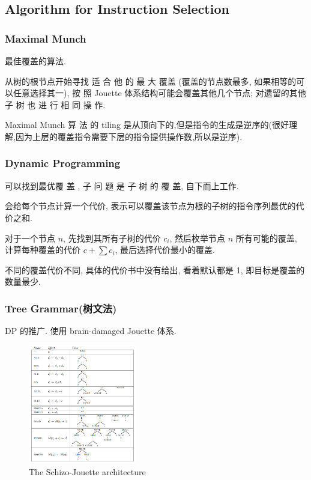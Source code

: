 \subsection{Algorithm for Instruction Selection}
\subsubsection{Maximal Munch}
最佳覆盖的算法.

从树的根节点开始寻找 适 合 他 的 最 大 覆盖 (覆盖的节点数最多, 如果相等的可以任意选择其一), 按 照 Jouette 体系结构可能会覆盖其他几个节点; 对遗留的其他 子 树 也 进 行 相 同 操 作.

Maximal Munch 算 法 的 tiling 是从顶向下的,但是指令的生成是逆序的(很好理解,因为上层的覆盖指令需要下层的指令提供操作数,所以是逆序).


\subsubsection{Dynamic Programming}
可以找到最优覆 盖 , 子 问 题 是 子 树 的 覆 盖, 自下而上工作.

会给每个节点计算一个代价, 表示可以覆盖该节点为根的子树的指令序列最优的代价之和. 

对于一个节点 $n$, 先找到其所有子树的代价 $c_i$, 然后枚举节点 $n$ 所有可能的覆盖, 计算每种覆盖的代价 $c+\sum c_i$, 最后选择代价最小的覆盖.

不同的覆盖代价不同, 具体的代价书中没有给出, 看着默认都是 1, 即目标是覆盖的数量最少.


\subsubsection{Tree Grammar(树文法)}
DP 的推广. 使用 brain-damaged Jouette 体系.

\begin{figure}[!htb]
    \centering
    \includegraphics[width=0.42\textwidth]{pic/CP9/The Schizo-Jouette architecture}
    \caption{The Schizo-Jouette architecture}
\end{figure}

